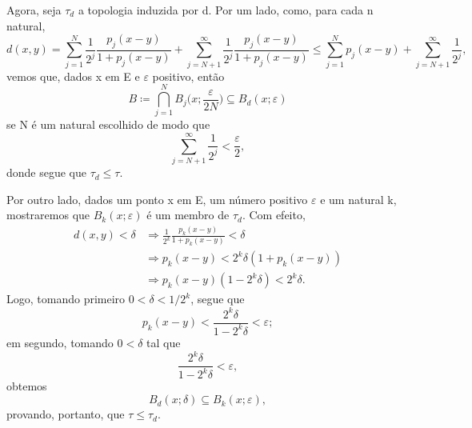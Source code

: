 \documentclass[../distribution_theory_notes.tex]{subfiles}
\begin{document}
\begin{proof*}
                             Agora, seja \(\tau_{d}\) a topologia induzida por d. Por um lado, como, para cada n natural, 
                               \[
                                 d(x, y)=\sum\limits_{j=1}^{N}\frac{1}{2^{j}}\frac{p_{j}(x-y)}{1+p_{j}(x-y)} + \sum\limits_{j=N+1}^{\infty}\frac{1}{2^{j}}\frac{p_{j}(x-y)}{1+p_{j}(x-y)} \leq \sum\limits_{j=1}^{N}p_{j}(x-y)+\sum\limits_{j=N+1}^{\infty}\frac{1}{2^j},
                               \]
                               vemos que, dados x em E e \(\varepsilon \) positivo, então 
                                 \[
                                   B\coloneqq \bigcap_{j=1}^{N}B_{j}\biggl(x; \frac{\varepsilon }{2N}\biggr)\subseteq B_{d}(x; \varepsilon )
                                 \]
                                 se N é um natural escolhido de modo que 
                                   \[
                                     \sum\limits_{j=N+1}^{\infty}\frac{1}{2^{j}}<\frac{\varepsilon }{2},
                                   \]
                                   donde segue que \(\tau_{d}\leq \tau \).

                                   Por outro lado, dados um ponto x em E, um número positivo \(\varepsilon \) e um natural k, mostraremos que \(B_{k}(x; \varepsilon )\) é um membro de \(\tau_{d}\). Com efeito, 
                                  \begin{align*}
                                    d(x, y)<\delta &\Rightarrow \frac{1}{2^{k}}\frac{p_{k}(x-y)}{1+p_{k}(x-y)}<\delta \\ 
                                                   &\Rightarrow p_{k}(x-y)<2^{k}\delta (1+p_{k}(x-y))\\ 
                                                   &\Rightarrow p_{k}(x-y)(1-2^{k}\delta )<2^{k}\delta .
                                  \end{align*}
                                  Logo, tomando primeiro \(0<\delta <1/2^{k}\), segue que 
                                    \[
                                      p_{k}(x-y)<\frac{2^{k}\delta }{1-2^{k}\delta }<\varepsilon;
                                    \]
                                    em segundo, tomando \(0<\delta \) tal que 
                                      \[
                                        \frac{2^{k}\delta }{1-2^{k}\delta }<\varepsilon ,
                                      \]
                                      obtemos 
                                        \[
                                          B_{d}(x; \delta )\subseteq B_{k}(x; \varepsilon ), 
                                        \]
                                        provando, portanto, que \(\tau \leq \tau_{d}\). \qedsymbol

\end{proof*}
\end{document}
